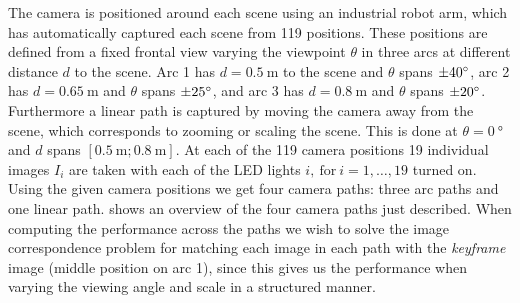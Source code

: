 \documentclass[thesis.tex]{subfiles}
\begin{document}
The camera is positioned around each scene using an industrial robot arm, which has automatically captured each scene from 119 positions. These positions are defined from a fixed frontal view varying the viewpoint $\theta$ in three arcs at different distance $d$ to the scene. Arc 1 has $d = \SI{0.5}{\meter}$ to the scene and $\theta$ spans $\SI{\pm40}{\degree}$, arc 2 has $d = \SI{0.65}{\meter}$ and $\theta$ spans $\SI{\pm25}{\degree}$, and arc 3 has $d = \SI{0.8}{\meter}$ and $\theta$ spans $\SI{\pm20}{\degree}$. Furthermore a linear path is captured by moving the camera away from the scene, which corresponds to zooming or scaling the scene. This is done at $\theta = \SI{0}{\degree}$ and $d$ spans $[\SI{0.5}{\meter};\SI{0.8}{\meter} ]$. At each of the 119 camera positions 19 individual images $I_i$ are taken with each of the LED lights $i,~\text{for}~i = 1,\hdots,19$ turned on. Using the given camera positions we get four camera paths: three arc paths and one linear path.  shows an overview of the four camera paths just described. When computing the performance across the paths we wish to solve the image correspondence problem for matching each image in each path with the \emph{keyframe} image (middle position on arc 1), since this gives us the performance when varying the viewing angle and scale in a structured manner.
%
\end{document}
